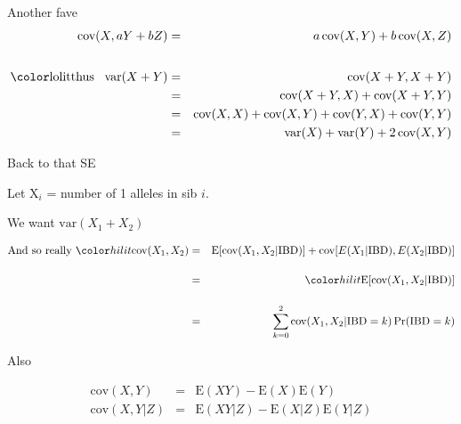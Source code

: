 \documentclass[aspectratio=169,12pt,t]{beamer}
\begin{document}
\begin{frame}[c]{Another fave}
  \begin{eqnarray*}
    \text{cov}(X, aY+bZ) & = & a \, \text{cov}(X,Y) + b \, \text{cov}(X,Z) \\[18pt]
    \text{{\lolit thus} \, var}(X+Y) & = & \text{cov}(X+Y,X+Y) \\
    & = & \text{cov}(X+Y, X) + \text{cov}(X+Y, Y) \\
    & = & \text{cov}(X, X) + \text{cov}(X, Y) + \text{cov}(Y,X) + \text{cov}(Y,Y) \\
    & = & \text{var}(X) + \text{var}(Y) + 2 \, \text{cov}(X,Y)
    \end{eqnarray*}
\end{frame}


\begin{frame}[c]{}
\end{frame}

\begin{frame}[c]{}
\end{frame}



\begin{frame}{Back to that SE}


  Let X$_i$ = number of 1 alleles in sib $i$.

  \bigskip

  We want $\text{var}(X_1 + X_2)$

  \bigskip

  \begin{eqnarray*}
  \text{And so really } {\hilit \text{cov}(X_1, X_2)} & = & \text{E}[\text{cov}(X_1, X_2 | \text{IBD})] + \text{cov}[E(X_1|\text{IBD}), E(X_2|\text{IBD})] \\[12pt]
   & = & {\hilit \text{E}[\text{cov}(X_1, X_2|\text{IBD})]} \\[12pt]
   & = & \sum_{k=0}^{2} \text{cov}(X_1, X_2|\text{IBD}=k) \, \text{Pr}(\text{IBD}=k)
   \end{eqnarray*}

\end{frame}



\begin{frame}{Also}

\bigskip

  \begin{eqnarray*}
    \text{cov}(X,Y) & = & \text{E}(XY) - \text{E}(X) \text{E}(Y) \\[24pt]
    \text{cov}(X,Y|Z) & = & \text{E}(XY|Z) - \text{E}(X|Z) \text{E}(Y|Z)
   \end{eqnarray*}

\end{frame}
\end{document}
